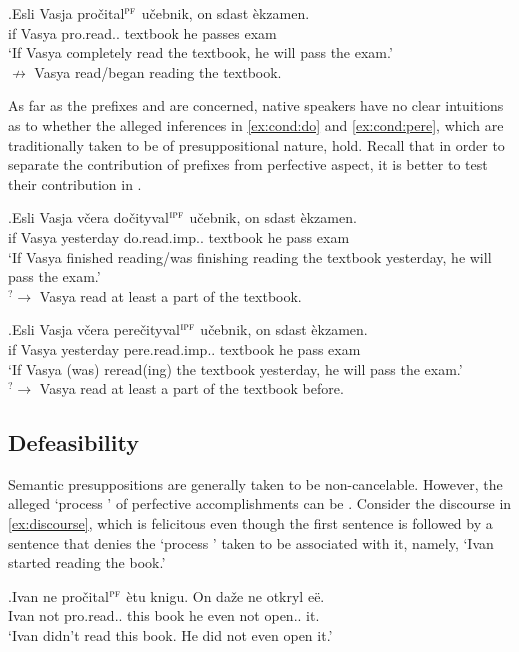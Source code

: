 \exg.\label{ex:cond}Esli Vasja pro\v{c}ital$^{\textsc{pf}}$ u\v{c}ebnik, on sdast \`{e}kzamen.\\
if Vasya pro.read.. textbook he passes exam\\
\trans `If Vasya completely read the textbook, he will pass the exam.'\\
$\nrightarrow$ Vasya read/began reading the textbook.

As far as the prefixes  and  are concerned, native speakers have no clear intuitions as to whether the alleged inferences in \ref{ex:cond:do} and \ref{ex:cond:pere}, which are traditionally taken to be of presuppositional nature, hold. Recall that in order to separate the contribution of prefixes from perfective aspect, it is better to test their contribution in .

\exg.\label{ex:cond:do}Esli Vasja v\v{c}era do\v{c}ityval$^{\textsc{ipf}}$ u\v{c}ebnik, on sdast \`{e}kzamen.\\
if Vasya yesterday do.read.imp.. textbook he pass exam\\
\trans `If Vasya finished reading/was finishing reading the textbook yesterday, he will pass the exam.'\\
$^?\rightarrow$ Vasya read at least a part of the textbook.

\exg.\label{ex:cond:pere}Esli Vasja v\v{c}era pere\v{c}ityval$^{\textsc{ipf}}$ u\v{c}ebnik, on sdast \`{e}kzamen.\\
if Vasya yesterday pere.read.imp.. textbook he pass exam\\
\trans `If Vasya (was) reread(ing) the textbook yesterday, he will pass the exam.'\\
$^?\rightarrow$ Vasya read at least a part of the textbook before.


\subsection{Defeasibility}
Semantic presuppositions are generally taken to be non-cancelable. However, the alleged `process ' of perfective accomplishments can be . Consider the discourse in \ref{ex:discourse}, which is felicitous even though the first sentence is followed by a sentence that denies the `process ' taken to be associated with it, namely, `Ivan started reading the book.'

\exg.\label{ex:discourse}Ivan ne pro\v{c}ital$^{\textsc{pf}}$ \`{e}tu knigu. On da\v{z}e ne otkryl e\"{e}.\\
Ivan not pro.read.. this book he even not open.. it.\\
\trans `Ivan didn't read this book. He did not even open it.'


